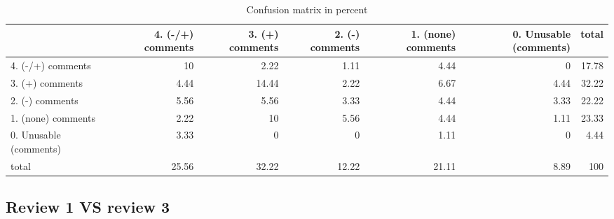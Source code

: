 \documentclass{article}
\begin{document}
\begin{table}[H]

\centering

\begin{tabular}{lrrrrrr}
\hline
                        &   4. (-/+) comments &   3. (+) comments &   2. (-) comments &   1. (none) comments &   0. Unusable (comments) &   total \\
\hline
 4. (-/+) comments      &               10    &              2.22 &              1.11 &                 4.44 &                     0    &   17.78 \\
 3. (+) comments        &                4.44 &             14.44 &              2.22 &                 6.67 &                     4.44 &   32.22 \\
 2. (-) comments        &                5.56 &              5.56 &              3.33 &                 4.44 &                     3.33 &   22.22 \\
 1. (none) comments     &                2.22 &             10    &              5.56 &                 4.44 &                     1.11 &   23.33 \\
 0. Unusable (comments) &                3.33 &              0    &              0    &                 1.11 &                     0    &    4.44 \\
 total                  &               25.56 &             32.22 &             12.22 &                21.11 &                     8.89 &  100    \\
\hline
\end{tabular}\caption{Confusion matrix in percent}

\end{table}



\subsection{Review 1 VS review 3} 
\end{document}
